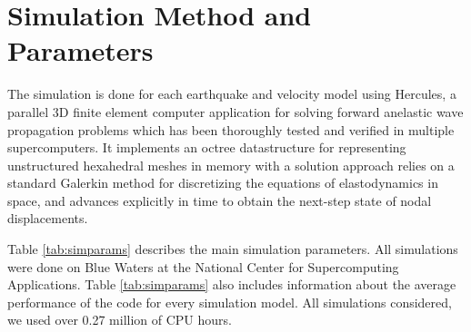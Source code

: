 
\section{Simulation Method and Parameters}

The simulation is done for each earthquake and velocity model using Hercules, a parallel 3D finite element computer application for solving forward anelastic wave propagation problems which has been thoroughly tested and verified in multiple supercomputers. It implements an octree datastructure for representing unstructured hexahedral meshes in memory \citep{Tu_2006_Proc} with a solution approach relies on a standard Galerkin method for discretizing the equations of elastodynamics in space, and advances explicitly in time to obtain the next-step state of nodal displacements.



Table \ref{tab:simparams} describes the main simulation parameters. All simulations were done on Blue Waters at the National Center for Supercomputing Applications. Table \ref{tab:simparams} also includes information about the average performance of the code for every simulation model. All simulations considered, we used over 0.27 million of CPU hours.

